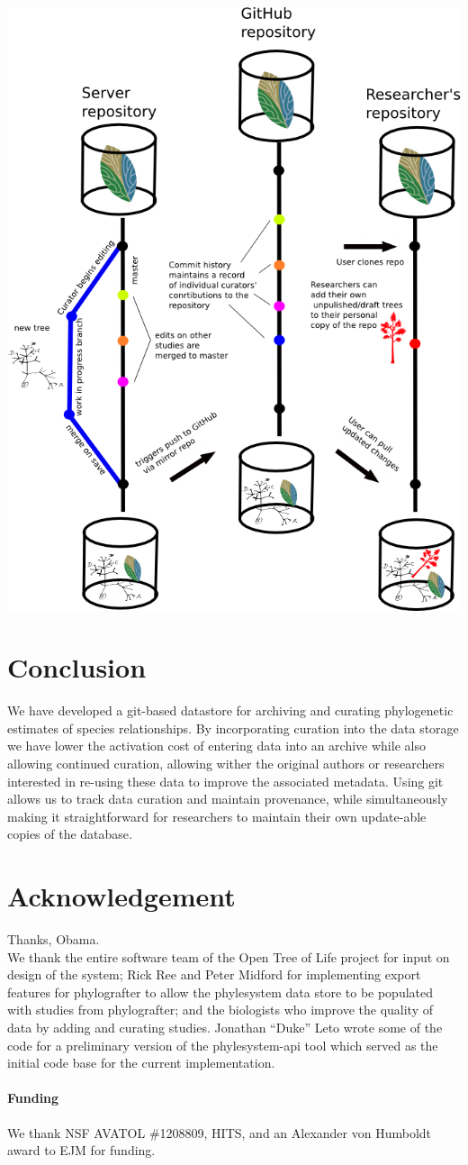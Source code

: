 \documentclass{bioinfo}
\newcommand{\ps}{phylesystem\xspace}
\newcommand{\otol}{Open Tree of Life\xspace}
\begin{document}
\includegraphics[scale=0.4]{workflow.png}

\section{Conclusion}
We have developed a git-based datastore for archiving and curating phylogenetic estimates of species relationships.
By incorporating curation into the data storage we have lower the activation cost of entering data into
    an archive while also allowing continued curation, allowing wither the original authors or researchers
    interested in re-using these data to improve the associated metadata.
Using git allows us to track data curation and maintain provenance, while simultaneously making it straightforward
    for researchers to maintain their own update-able copies of the database.

\section*{Acknowledgement} Thanks, Obama.\\
We thank the entire software team of the \otol project for input on design of the system;
Rick Ree and Peter Midford for implementing export features for phylografter to allow the \ps
    data store to be populated with studies from phylografter; and 
the biologists who improve the quality of data by adding and curating studies.
Jonathan ``Duke'' Leto wrote some of the code for a preliminary version of the \ps-api tool
    which served as the initial code base for the current implementation.
\paragraph{Funding\textcolon} We thank NSF AVATOL \#1208809, HITS, and an Alexander von Humboldt award to EJM for funding.


\end{document}
